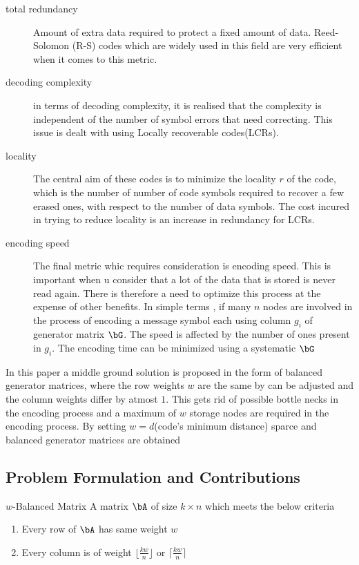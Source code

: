 \documentclass[11pt, oneside, dvipdfmx]{book}
\begin{document}
\begin{description}
\item[total redundancy] Amount of extra data required to protect a fixed amount of data. Reed-Solomon (R-S) codes which are widely used in this field are very efficient when it comes to this metric. 

\item[decoding complexity] in terms of decoding complexity, it is realised that the complexity is independent of the number of symbol errors that need correcting. This issue is dealt with using Locally recoverable codes(LCRs). 

\item[locality] The central aim of these codes is to minimize the locality $r$ of the code, which is the number of number of code symbols required to recover a few erased ones, with respect to the number of data symbols. The cost incured in trying to reduce locality is an increase in redundancy for LCRs.

\item[encoding speed] The final metric whic requires consideration is encoding speed. This is important when u consider that a lot of the data that is stored is never read again. There is therefore a need to optimize this process at the expense of other benefits. In simple terms , if many $n$ nodes are involved in the process of encoding a message symbol each using column $g_i$ of generator matrix $\bG$. The speed is affected by the number of ones present in $g_i$. The encoding time can be minimized using a systematic $\bG$
\end{description}
 
In this paper a middle ground solution is proposed in the form of balanced generator matrices, where the row weights $w$ are the same by can be adjusted and the column weights differ by atmost $1$. This gets rid of possible bottle necks in the encoding process and a maximum of $w$ storage nodes are required in the encoding process. By setting $w=d$(code's minimum distance) sparce and balanced generator matrices are obtained


\subsection{Problem Formulation and Contributions}

\begin{MyDefinition}{$w$-Balanced Matrix} 
A matrix $\bA$ of size $k \times n$ which meets the below criteria

\begin{enumerate}
\item Every row of $\bA$ has same weight $w$

\item Every column is of weight $ \lfloor\frac{kw}{n} \rfloor$ or $ \lceil\frac{kw}{n} \rceil$
\end{enumerate}

\end{MyDefinition}
\end{document}
